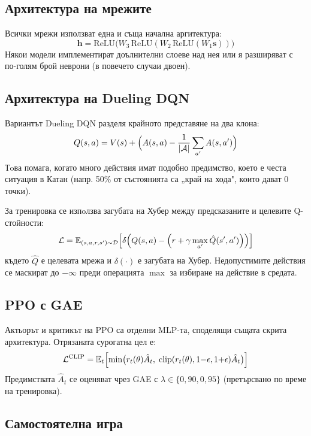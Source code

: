 \documentclass[11pt,a4paper]{article}
\newcommand{\eg}{{напр.}\xspace}
\begin{document}
\subsection{Архитектура на мрежите}
Всички мрежи използват една и съща начална аргитектура:
\[
\mathbf{h} = \text{ReLU}\bigl(W_3\,\text{ReLU}(W_2\,\text{ReLU}(W_1 \mathbf{s}))\bigr)
\]
Някои модели имплементират доълнителни слоеве над нея или я разширяват с по-голям брой неврони (в повечето случаи двоен).

\subsection{Архитектура на Dueling DQN}
Вариантът Dueling DQN разделя крайното представяне на два клона:
\begin{equation}
Q(s, a) = V(s) + \Bigl(A(s, a) - \frac{1}{|\mathcal{A}|}\sum_{a'}A(s,a')\Bigr)
\end{equation}
Тoва помага, когато много действия имат подобно предимство, което
е честа ситуация в Катан (\eg 50\% от състоянията са „край на хода", които дават 0 точки).

За тренировка се изпoлзва загубата на Хубер между предсказаните и целевите
Q-стойности:
\begin{equation}
\mathcal{L} = \mathbb{E}_{(s,a,r,s') \sim \mathcal{D}}
\Bigl[\delta\!\left(Q(s,a) - \Bigl(r + \gamma \max_{a'}\hat{Q}(s',a')\Bigr)\right)\Bigr]
\end{equation}
където $\hat{Q}$ е целевата мрежа и $\delta(\cdot)$ е загубата на Хубер.
Недопустимите действия се маскират до $-\infty$ преди операцията $\max$ за избиране на действие в средата.

\subsection{PPO с GAE}

Актьорът и критикът на PPO са отделни MLP-та, споделящи същата скрита
архитектура. Отрязаната сурогатна цел е:
\begin{equation}
\mathcal{L}^{\text{CLIP}} = \mathbb{E}_t\Bigl[
  \min\bigl(r_t(\theta)\hat{A}_t,\;
  \text{clip}(r_t(\theta), 1{-}\epsilon, 1{+}\epsilon)\hat{A}_t\bigr)
\Bigr]
\end{equation}
Предимствата $\hat{A}_t$ се оценяват чрез GAE с $\lambda \in \{0{,}90, 0{,}95\}$
(претърсвано по време на тренировка).

\subsection{Самостоятелна игра}
\end{document}
